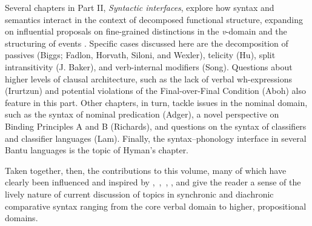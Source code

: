 \documentclass[output=paper]{langsci/langscibook}
\begin{document}
Several chapters in Part II, \emph{Syntactic interfaces}, explore how syntax
and semantics interact in the context of decomposed functional structure,
expanding on influential proposals on fine-grained distinctions in the
\emph{v}-domain \parencite{Chomsky1995,Kratzer1996} and the structuring of
events
\parencite{Borer2003,Borer2005a,Borer2005b,Borer2013,Ramchand2008,Ramchand2018}.
Specific cases discussed here are the decomposition of passives (Biggs; Fadlon,
Horvath, Siloni, and Wexler), telicity (Hu), split intransitivity (J. Baker),
and verb-internal modifiers (Song). Questions about higher levels of clausal
architecture, such as the lack of verbal wh-expressions (Irurtzun) and
potential violations of the Final-over-Final Condition (Aboh) also feature in
this part. Other chapters, in turn, tackle issues in the nominal domain, such
as the syntax of nominal predication (Adger), a novel perspective on Binding
Principles A and B (Richards), and questions on the syntax of classifiers and
classifier languages (Lam). Finally, the syntax–phonology interface in several
Bantu languages is the topic of Hyman’s
chapter.\enlargethispage{1\baselineskip}

Taken together, then, the contributions to this volume, many of which have
clearly been influenced and inspired by
\textcite{Roberts2010,Roberts2012,Roberts2014,Roberts2019},~\textcite{RobRou2003},~\textcite{RobHol2010},
\textcite{BibRob2012,BibRob2015}, and \textcite{BibHolRob2014} give the reader
a sense of the lively nature of current discussion of topics in synchronic and
diachronic comparative syntax ranging from the core verbal domain to higher,
propositional domains.

{\sloppy
    \printbibliography[heading=subbibliography,notkeyword=this]
}
\end{document}
